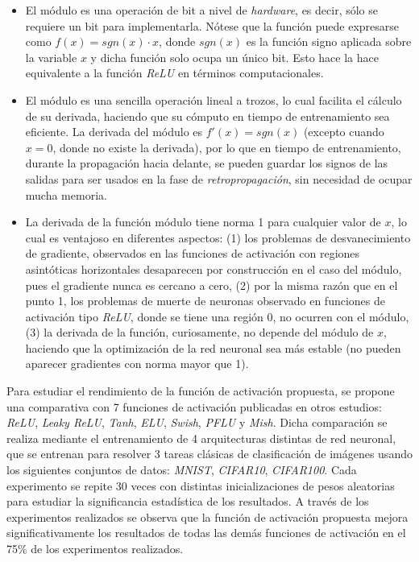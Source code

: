 \begin{itemize}
	\item El módulo es una operación de bit a nivel de \textit{hardware}, es decir, sólo se requiere un bit para implementarla. Nótese que la función puede expresarse como $f(x) = sgn(x) \cdot x$, donde $sgn(x)$ es la función signo aplicada sobre la variable $x$ y dicha función solo ocupa un único bit. Esto hace la hace equivalente a la función \textit{ReLU} en términos computacionales.
	\item El módulo es una sencilla operación lineal a trozos, lo cual facilita el cálculo de su derivada, haciendo que su cómputo en tiempo de entrenamiento sea eficiente. La derivada del módulo es $f'(x) = sgn(x)$ (excepto cuando $x=0$, donde no existe la derivada), por lo que en tiempo de entrenamiento, durante la propagación hacia delante, se pueden guardar los signos de las salidas para ser usados en la fase de \textit{retropropagación}, sin necesidad de ocupar mucha memoria. 
	\item La derivada de la función módulo tiene norma 1 para cualquier valor de $x$, lo cual es ventajoso en diferentes aspectos: (1) los problemas de desvanecimiento de gradiente, observados en las funciones de activación con regiones asintóticas horizontales desaparecen por construcción en el caso del módulo, pues el gradiente nunca es cercano a cero, (2) por la misma razón que en el punto 1, los problemas de muerte de neuronas observado en funciones de activación tipo \textit{ReLU}, donde se tiene una región 0, no ocurren con el módulo, (3) la derivada de la función, curiosamente, no depende del módulo de $x$, haciendo que la optimización de la red neuronal sea más estable (no pueden aparecer gradientes con norma mayor que 1).
\end{itemize}


Para estudiar el rendimiento de la función de activación propuesta, se propone una comparativa con 7 funciones de activación publicadas en otros estudios: \textit{ReLU}, \textit{Leaky ReLU}, \textit{Tanh}, \textit{ELU}, \textit{Swish}, \textit{PFLU} y \textit{Mish}. Dicha comparación se realiza mediante el entrenamiento de 4 arquitecturas distintas de red neuronal, que se entrenan para resolver 3 tareas clásicas de clasificación de imágenes usando los siguientes conjuntos de datos: \textit{MNIST}, \textit{CIFAR10}, \textit{CIFAR100}. Cada experimento se repite 30 veces con distintas inicializaciones de pesos aleatorias para estudiar la significancia estadística de los resultados. A través de los experimentos realizados se observa que la función de activación propuesta mejora significativamente los resultados de todas las demás funciones de activación en el 75\% de los experimentos realizados. 

